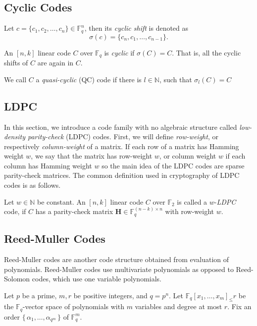 \subsection{Cyclic Codes}
Let $c=\{c_1, c_2, \dots, c_n\} \in \mathbb{F}_q^n$, then its \textit{cyclic shift} is denoted as
\[
\sigma(c) = \{c_n, c_1, \dots, c_{n-1}\}.
\]

\begin{definition}
An $[n, k]$ linear code $C$ over $\mathbb{F}_q$ is \textit{cyclic} if $\sigma(C) = C$. That is, all the cyclic shifts of $C$ are again in $C$.    
\end{definition}
We call $C$ a \textit{quasi-cyclic} (QC) code if there is $l \in \mathbb{N}$, such that $\sigma_l(C) = C$

\subsection{LDPC}
In this section, we introduce a code family with no algebraic structure called \textit{low-density parity-check} (LDPC) codes. First, we will define \textit{row-weight}, or respectively \textit{column-weight} of a matrix. If each row of a matrix has Hamming weight $w$, we say that the matrix has row-weight $w$, or column weight $w$ if each column has Hamming weight $w$ so the main idea of the LDPC codes are sparse parity-check matrices. The common definition used in cryptography of LDPC codes is as follows.

\begin{definition}
Let $w \in \mathbb{N}$ be constant. An $[n, k]$ linear code $C$ over $\mathbb{F}_2$ is called a $w$-\textit{LDPC} code, if $C$ has a parity-check matrix $\mathbf{H} \in\mathbb{F}_q^{(n-k)\times n}$ with row-weight $w$.
\end{definition}



\subsection{Reed-Muller Codes}

Reed-Muller codes are another code structure obtained from evaluation of polynomials. Reed-Muller codes use multivariate polynomials as opposed to Reed-Solomon codes, which use one variable polynomials.

Let $p$ be a prime, $m,r$ be positive integers, and $q = p^n$. Let $\mathbb{F}_q[x_1, \dots, x_m]_\leq r$ be the $\mathbb{F}_q$-vector space of polynomials with $m$ variables and degree at most $r$. Fix an order $\{\, \alpha_1, \dots, \alpha_{q^m} \,\}$ of $\mathbb{F}_q^m$.


